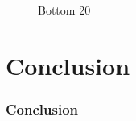 \documentclass{beamer}
\begin{document}
\begin{frame}
\begin{minipage}{.5\textwidth}
\begin{figure}
\caption{Bottom 20}
\end{figure}
\end{minipage}

\end{frame}


\section{Conclusion}
\begin{frame}
\frametitle{Conclusion}



\end{frame}
\end{document}
